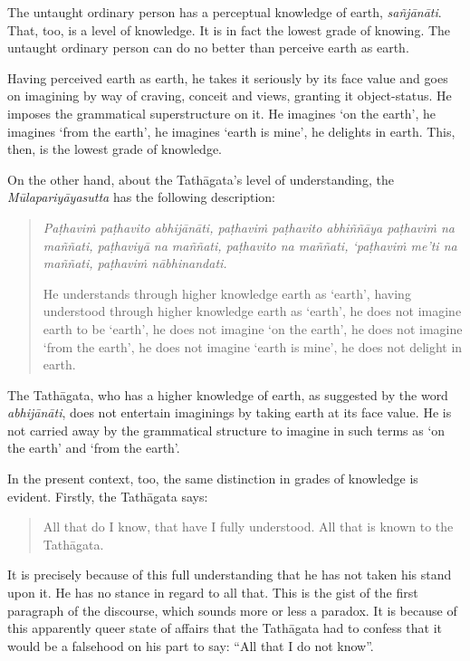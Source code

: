 The untaught ordinary person has a perceptual knowledge of earth, \emph{sañjānāti}. That, too, is a level of knowledge. It is in fact the lowest grade of knowing. The untaught ordinary person can do no better than perceive earth as earth.

Having perceived earth as earth, he takes it seriously by its face value and goes on imagining by way of craving, conceit and views, granting it object-status. He imposes the grammatical superstructure on it. He imagines `on the earth', he imagines `from the earth', he imagines `earth is mine', he delights in earth. This, then, is the lowest grade of knowledge.

On the other hand, about the Tathāgata's level of understanding, the \emph{Mūlapariyāyasutta} has the following description:

\begin{quote}
\emph{Paṭhaviṁ paṭhavito abhijānāti, paṭhaviṁ paṭhavito abhiññāya paṭhaviṁ na maññati, paṭhaviyā na maññati, paṭhavito na maññati, `paṭhaviṁ me'ti na maññati, paṭhaviṁ nābhinandati.}

He understands through higher knowledge earth as `earth', having understood through higher knowledge earth as `earth', he does not imagine earth to be `earth', he does not imagine `on the earth', he does not imagine `from the earth', he does not imagine `earth is mine', he does not delight in earth.
\end{quote}

The Tathāgata, who has a higher knowledge of earth, as suggested by the word \emph{abhijānāti}, does not entertain imaginings by taking earth at its face value. He is not carried away by the grammatical structure to imagine in such terms as `on the earth' and `from the earth'.

In the present context, too, the same distinction in grades of knowledge is evident. Firstly, the Tathāgata says:

\begin{quote}
All that do I know, that have I fully understood. All that is known to the Tathāgata.
\end{quote}

It is precisely because of this full understanding that he has not taken his stand upon it. He has no stance in regard to all that. This is the gist of the first paragraph of the discourse, which sounds more or less a paradox. It is because of this apparently queer state of affairs that the Tathāgata had to confess that it would be a falsehood on his part to say: ``All that I do not know''.

